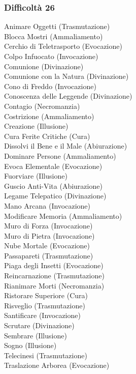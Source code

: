 \begin{multicols}{3}
	\subsubsection{Difficoltà 26}
	Animare Oggetti (Trasmutazione)\\
	Blocca Mostri (Ammaliamento)\\
	Cerchio di Teletrasporto (Evocazione)\\
	Colpo Infuocato (Invocazione)\\
	Comunione (Divinazione)\\
	Comunione con la Natura (Divinazione)\\
	Cono di Freddo (Invocazione)\\
	Conoscenza delle Leggende (Divinazione)\\
	Contagio (Necromanzia)\\
	Costrizione (Ammaliamento)\\
	Creazione (Illusione)\\
	Cura Ferite Critiche (Cura)\\
	Dissolvi il Bene e il Male (Abiurazione)\\
	Dominare Persone (Ammaliamento)\\
	Evoca Elementale (Evocazione)\\
	Fuorviare (Illusione)\\
	Guscio Anti-Vita (Abiurazione)\\
	Legame Telepatico (Divinazione)\\
	Mano Arcana (Invocazione)\\
	Modificare Memoria (Ammaliamento)\\
	Muro di Forza (Invocazione)\\
	Muro di Pietra (Invocazione)\\
	Nube Mortale (Evocazione)\\
	Passapareti (Trasmutazione)\\
	Piaga degli Insetti (Evocazione)\\
	Reincarnazione (Trasmutazione)\\
	Rianimare Morti (Necromanzia)\\
	Ristorare Superiore (Cura)\\
	Risveglio (Trasmutazione)\\
	Santificare (Invocazione)\\
	Scrutare (Divinazione)\\
	Sembrare (Illusione)\\
	Sogno (Illusione)\\
	Telecinesi (Trasmutazione)\\
	Traslazione Arborea (Evocazione)\\
	

\end{multicols}
